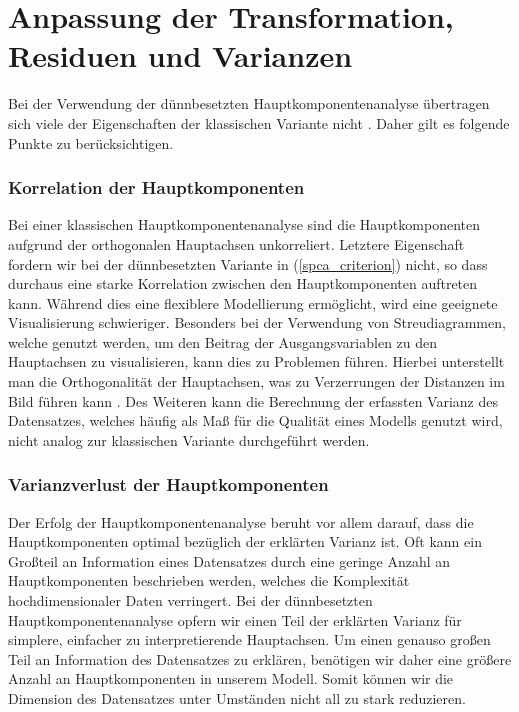 \section{Anpassung der Transformation, Residuen und Varianzen}
\label{adjustment_of_variances}

Bei der Verwendung der dünnbesetzten Hauptkomponentenanalyse übertragen sich viele der Eigenschaften der klassischen Variante nicht \cite{camacho}. Daher gilt es folgende Punkte zu berücksichtigen.

\subsubsection{Korrelation der Hauptkomponenten}

Bei einer klassischen Hauptkomponentenanalyse sind die Hauptkomponenten aufgrund der orthogonalen Hauptachsen unkorreliert. Letztere Eigenschaft fordern wir bei der dünnbesetzten Variante in (\ref{spca_criterion}) nicht, so dass durchaus eine starke Korrelation zwischen den Hauptkomponenten auftreten kann. Während dies eine flexiblere Modellierung ermöglicht, wird eine geeignete Visualisierung schwieriger. Besonders bei der Verwendung von Streudiagrammen, welche genutzt werden, um den Beitrag der Ausgangsvariablen zu den Hauptachsen zu visualisieren, kann dies zu Problemen führen. Hierbei unterstellt man die Orthogonalität der Hauptachsen, was zu Verzerrungen der Distanzen im Bild führen kann \cite{geladi}. Des Weiteren kann die Berechnung der erfassten Varianz des Datensatzes, welches häufig als Maß für die Qualität eines Modells genutzt wird, nicht analog zur klassischen Variante durchgeführt werden.

\subsubsection{Varianzverlust der Hauptkomponenten}

Der Erfolg der Hauptkomponentenanalyse beruht vor allem darauf, dass die Hauptkomponenten optimal bezüglich der erklärten Varianz ist. Oft kann ein Großteil an Information eines Datensatzes durch eine geringe Anzahl an Hauptkomponenten beschrieben werden, welches die Komplexität hochdimensionaler Daten verringert. Bei der dünnbesetzten Hauptkomponentenanalyse opfern wir einen Teil der erklärten Varianz für simplere, einfacher zu interpretierende Hauptachsen. Um einen genauso großen Teil an Information des Datensatzes zu erklären, benötigen wir daher eine größere Anzahl an Hauptkomponenten in unserem Modell. Somit können wir die Dimension des Datensatzes unter Umständen nicht all zu stark reduzieren.

